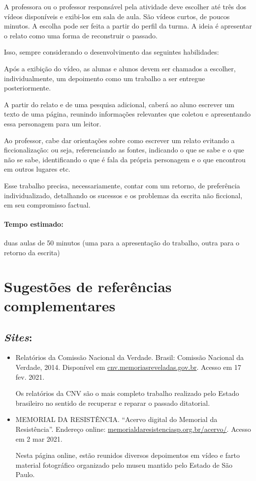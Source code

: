 \documentclass[12pt]{extarticle}
\begin{document}
A professora ou o professor responsável pela atividade deve escolher até
três dos vídeos disponíveis e exibi-los em sala de aula. São vídeos
curtos, de poucos minutos. A escolha pode ser feita a partir do perfil
da turma. A ideia é apresentar o relato como uma forma de
reconstruir o passado.

Isso, sempre considerando o desenvolvimento das seguintes habilidades:


Após a exibição do vídeo, as alunas e alunos devem ser chamados a
escolher, individualmente, um depoimento como um trabalho a ser entregue
posteriormente.

A partir do relato e de uma pesquisa adicional, caberá ao aluno escrever
um texto de uma página, reunindo informações relevantes que coletou e
apresentando essa personagem para um leitor.

Ao professor, cabe dar orientações sobre como escrever um relato
evitando a ficcionalização: ou seja, referenciando as fontes, indicando
o que se sabe e o que não se sabe, identificando o que é fala da própria
personagem e o que encontrou em outros lugares etc.

Esse trabalho precisa, necessariamente, contar com um retorno, de
preferência individualizado, detalhando os sucessos e os problemas da
escrita não ficcional, em seu compromisso factual.

\paragraph{Tempo estimado:} duas aulas de 50 minutos (uma para a
apresentação do trabalho, outra para o retorno da escrita)


\section{Sugestões de referências complementares}

\subsection{\emph{Sites}:}

\begin{itemize}
\item Relatórios da Comissão Nacional da Verdade. Brasil: Comissão
Nacional da Verdade, 2014. Disponível em
\href{http://cnv.memoriasreveladas.gov.br/}{{cnv.memoriasreveladas.gov.br}}.
Acesso em 17 fev. 2021.

Os relatórios da CNV são o mais completo trabalho realizado pelo Estado
brasileiro no sentido de recuperar e reparar o passado ditatorial.

\item \textsc{MEMORIAL DA RESISTÊNCIA}. ``Acervo digital do Memorial da Resistência''. Endereço online: \href{http://http://memorialdaresistenciasp.org.br/acervo/}{{memorialdaresistenciasp.org.br/acervo/}}.
Acesso em 2 mar 2021.

Nesta página online, estão reunidos diversos depoimentos em vídeo e farto material fotográfico organizado pelo museu mantido pelo Estado de São Paulo.
\end{itemize}
\end{document}
